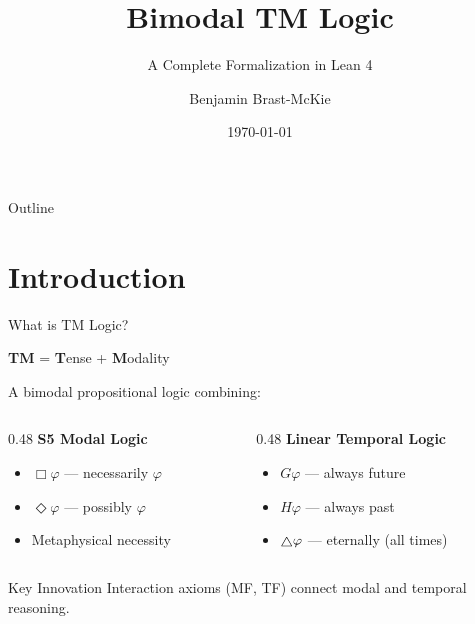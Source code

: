 \documentclass[aspectratio=169,11pt]{beamer}
\title{\textbf{Bimodal TM Logic}}
\subtitle{A Complete Formalization in Lean 4}
\author{Benjamin Brast-McKie}
\institute{ProofChecker Project}
\date{\today}
\newcommand{\nec}{\Box}
\newcommand{\poss}{\Diamond}
\newcommand{\allpast}{H}
\newcommand{\allfuture}{G}
\newcommand{\always}{\ensuremath \raisebox{-1.3pt}{$\triangle$}}
\begin{document}

\begin{frame}
\titlepage
\end{frame}


\begin{frame}{Outline}
\tableofcontents
\end{frame}


\section{Introduction}

\begin{frame}{What is TM Logic?}

\textbf{TM} = \textbf{T}ense + \textbf{M}odality

\vspace{0.5cm}

A bimodal propositional logic combining:

\begin{columns}
\begin{column}{0.48\textwidth}
\textbf{S5 Modal Logic}
\begin{itemize}
    \item $\nec\varphi$ --- necessarily $\varphi$
    \item $\poss\varphi$ --- possibly $\varphi$
    \item Metaphysical necessity
\end{itemize}
\end{column}
\begin{column}{0.48\textwidth}
\textbf{Linear Temporal Logic}
\begin{itemize}
    \item $\allfuture\varphi$ --- always future
    \item $\allpast\varphi$ --- always past
    \item $\always\varphi$ --- eternally (all times)
\end{itemize}
\end{column}
\end{columns}

\vspace{0.5cm}

\begin{block}{Key Innovation}
Interaction axioms (MF, TF) connect modal and temporal reasoning.
\end{block}

\end{frame}
\end{document}
